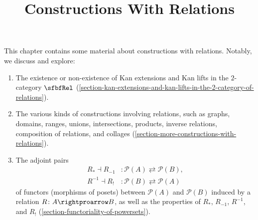 

%



\title{Constructions With Relations}

\maketitle

\label{section-phantom}

This chapter contains some material about constructions with relations. Notably, we discuss and explore:
\begin{enumerate}
    \item\label{constructions-with-relations-introduction-item-1}The existence or non-existence of Kan extensions and Kan lifts in the $2$-category $\sfbfRel$ (\cref{section-kan-extensions-and-kan-lifts-in-the-2-category-of-relations}).
    \item\label{constructions-with-relations-introduction-item-2}The various kinds of constructions involving relations, such as graphs, domains, ranges, unions, intersections, products, inverse relations, composition of relations, and collages (\cref{section-more-constructions-with-relations}).
    \item\label{constructions-with-relations-introduction-item-3}The adjoint pairs
        \begin{align*}
            R_{*}  \dashv R_{-1} &\colon \mathcal{P}(A) \rightleftarrows \mathcal{P}(B),\\
            R^{-1} \dashv R_{!}  &\colon \mathcal{P}(B) \rightleftarrows \mathcal{P}(A)
        \end{align*}
        of functors (morphisms of posets) between $\mathcal{P}(A)$ and $\mathcal{P}(B)$ induced by a relation $R\colon A\rightproarrow B$, as well as the properties of $R_{*}$, $R_{-1}$, $R^{-1}$, and $R_{!}$ (\cref{section-functoriality-of-powersets}).


\end{enumerate}
